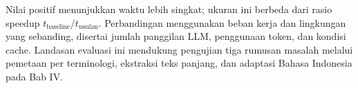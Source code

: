 \enlargethispage{\baselineskip}
 Nilai positif menunjukkan waktu lebih singkat; ukuran ini berbeda dari rasio speedup $t_{\mathrm{baseline}}/t_{\mathrm{usulan}}$. Perbandingan menggunakan beban kerja dan lingkungan yang sebanding, disertai jumlah panggilan LLM, penggunaan token, dan kondisi cache. Landasan evaluasi ini mendukung pengujian tiga rumusan masalah melalui pemetaan per terminologi, ekstraksi teks panjang, dan adaptasi Bahasa Indonesia pada Bab IV.


